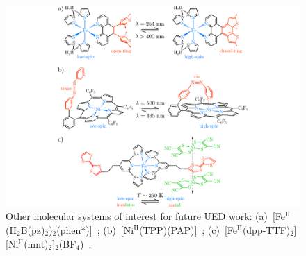 \begin{figure}[ht!]
  \centering
  \includegraphics[width = \textwidth]{Figures/fig_future_mol.pdf}
  \caption[Other molecular systems of interest for future UED work.]{
    Other molecular systems of interest for future UED work:
    (a)~[Fe$^\text{II}$(H$_2$B(pz)$_2$)$_2$(phen*)]~\cite{Milek2013};
    (b)~[Ni$^\text{II}$(TPP)(PAP)]~\cite{Venkataramani2011};
    (c)~[Fe$^\text{II}$(dpp-TTF)$_2$] [Ni$^\text{II}$(mnt)$_2$]$_2$(BF$_4$)~\cite{Nihei2011}.
  }
  \label{fig: future-molecules}
\end{figure}











%
